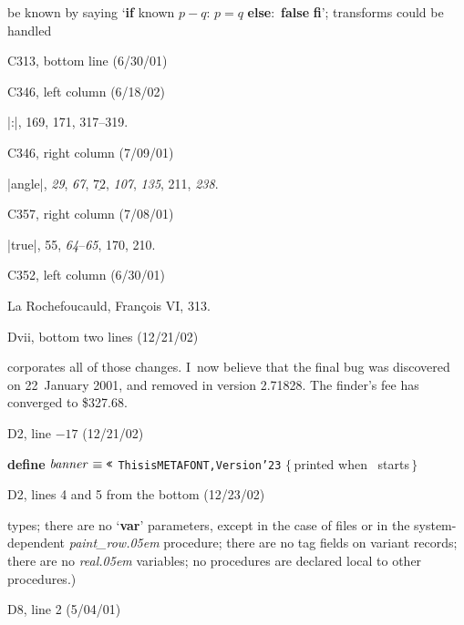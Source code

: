 {\ninepoint\noindent
be known by saying `{\bf if\/} known $p-q$: $p=q$ {\bf else}:~{\bf false}
{\bf fi}'; transforms could be handled\cutpar

\bugonpage C313, bottom line (6/30/01)


\bugonpage C346, left column (6/18/02)

\eightpoint\noindent
\llap{*}|:|, 169, 171, 317--319.

\bugonpage C346, right column (7/09/01)

\eightpoint\noindent
\llap{*}|angle|, {\it29}, {\it67}, $\underline{72}$, {\it107},
{\it135}, 211, {\it238}.

\bugonpage C357, right column (7/08/01)

\eightpoint\noindent
\llap{*}|true|, 55, {\it64\/}--{\it65}, 170, 210.

\bugonpage C352, left column (6/30/01)

\eightpoint\noindent
La Rochefoucauld, Fran\c cois VI, 313.

\def\\#1{\hbox{\it#1\/\kern.05em}} %
\def\to{\mathrel{.\,.}} %

\bugonpage Dvii, bottom two lines (12/21/02)

\eightpoint\noindent
corporates all of those changes.
I~now believe that the final bug was discovered on 22~January 2001,
and removed in version 2.71828.
The finder's fee has converged to \$327.68.

\hsize=35pc

\bugonpage D2, line $-17$ (12/21/02)

\ninepoint\noindent
{\bf define} $\\{banner}\equiv\hbox{\tt\char'23}$%
{\tt This\]is\]METAFONT,\]Version\char'23}\quad
$\{\,$printed when \MF\ starts$\,\}$

\bugonpage D2, lines 4 and 5 from the bottom (12/23/02)

\tenpoint\noindent
types; there are no `{\bf var}' parameters, except in the case of files
or in the system-dependent \\{paint\_row} procedure;
there are no tag fields on variant records; there are no \\{real} variables;
no procedures are declared local to other procedures.)

\bugonpage D8, line 2 (5/04/01)

}

